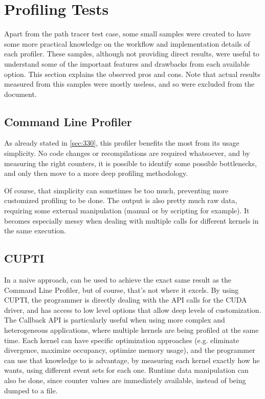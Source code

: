 \section{Profiling Tests}
\label{sec:520}

Apart from the path tracer test case, some small samples were created to have some more practical knowledge on the workflow and implementation details of each profiler. These samples, although not providing direct results, were useful to understand some of the important features and drawbacks from each available option. This section explains the observed pros and cons. Note that actual results measured from this samples were mostly useless, and so were excluded from the document.

\subsection{Command Line Profiler}
\label{sec:521}

As already stated in \cref{sec:330}, this profiler benefits the most from its usage simplicity. No code changes or recompilations are required whatsoever, and by measuring the right counters, it is possible to identify some possible bottlenecks, and only then move to a more deep profiling methodology.

Of course, that simplicity can sometimes be too much, preventing more customized profiling to be done. The output is also pretty much raw data, requiring some external manipulation (manual or by scripting for example). It becomes especially messy when dealing with multiple calls for different kernels in the same execution.

\subsection{CUPTI}
\label{sec:522}

In a naive approach, can be used to achieve the exact same result as the Command Line Profiler, but of course, that's not where it excels. By using CUPTI, the programmer is directly dealing with the API calls for the CUDA driver, and has access to low level options that allow deep levels of customization. The Callback API is particularly useful when using more complex and heterogeneous applications, where multiple kernels are being profiled at the same time. Each kernel can have specific optimization approaches (e.g. eliminate divergence, maximize occupancy, optimize memory usage), and the programmer can use that knowledge to is advantage, by measuring each kernel exactly how he wants, using different event sets for each one.
Runtime data manipulation can also be done, since counter values are immediately available, instead of being dumped to a file.

